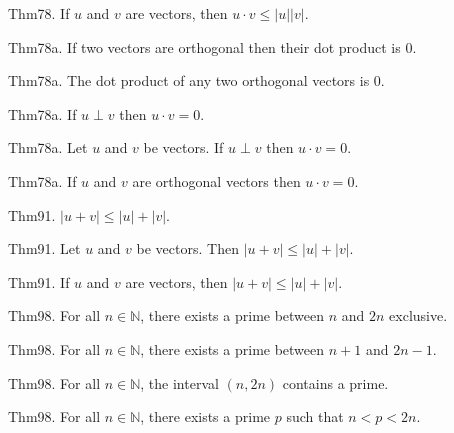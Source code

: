 \documentclass{report}
\begin{document}
Thm78. If $u$ and $v$ are vectors, then $u \cdot v \leq \lvert u \rvert \lvert v \rvert$.

Thm78a. If two vectors are orthogonal then their dot product is $0$.

Thm78a. The dot product of any two orthogonal vectors is $0$.

Thm78a. If $u \perp v$ then $u \cdot v = 0$.

Thm78a. Let $u$ and $v$ be vectors. If $u \perp v$ then $u \cdot v = 0$.

Thm78a. If $u$ and $v$ are orthogonal vectors then $u \cdot v = 0$.

Thm91. $\lvert u+v \rvert \leq \lvert u \rvert+\lvert v \rvert$.

Thm91. Let $u$ and $v$ be vectors. Then $\lvert u+v \rvert \leq \lvert u \rvert+\lvert v \rvert$.

Thm91. If $u$ and $v$ are vectors, then $\lvert u+v \rvert \leq \lvert u \rvert+\lvert v \rvert$.

Thm98. For all $n \in \mathbb{N}$, there exists a prime between $n$ and $2n$ exclusive.

Thm98. For all $n \in \mathbb{N}$, there exists a prime between $n+1$ and $2n-1$.

Thm98. For all $n \in \mathbb{N}$, the interval $(n, 2n)$ contains a prime.

Thm98. For all $n \in \mathbb{N}$, there exists a prime $p$ such that $n < p < 2n$.
\end{document}
